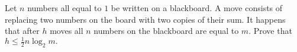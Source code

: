 Let $n$ numbers all equal to $1$ be written on a blackboard. A move consists of replacing two numbers on the board with two copies of their sum. It happens that after $h$ moves all $n$ numbers on the blackboard are equal to $m.$ Prove that $h \leq \frac{1}{2}n \log_2 m.$